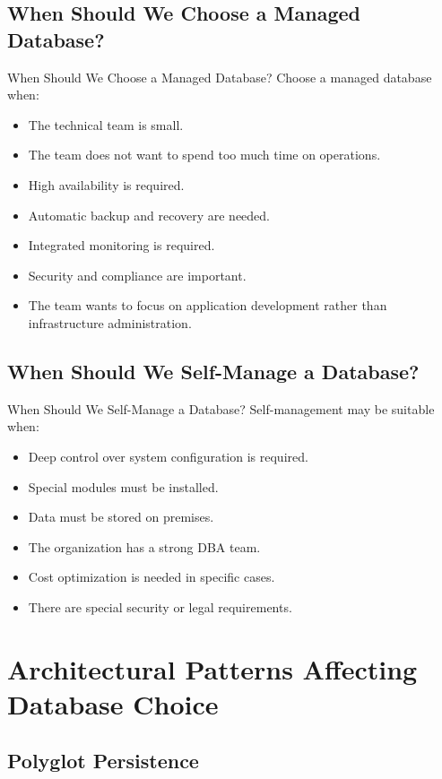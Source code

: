 \documentclass[aspectratio=169,11pt]{beamer}
\newcommand{\smallitem}{\setlength{\itemsep}{2pt}\setlength{\parskip}{0pt}}
\begin{document}
\subsection{When Should We Choose a Managed Database?}
\begin{frame}{When Should We Choose a Managed Database?}
Choose a managed database when:
\begin{itemize}
  \smallitem
  \item The technical team is small.
  \item The team does not want to spend too much time on operations.
  \item High availability is required.
  \item Automatic backup and recovery are needed.
  \item Integrated monitoring is required.
  \item Security and compliance are important.
  \item The team wants to focus on application development rather than infrastructure administration.
\end{itemize}
\end{frame}

\subsection{When Should We Self-Manage a Database?}
\begin{frame}{When Should We Self-Manage a Database?}
Self-management may be suitable when:
\begin{itemize}
  \smallitem
  \item Deep control over system configuration is required.
  \item Special modules must be installed.
  \item Data must be stored on premises.
  \item The organization has a strong DBA team.
  \item Cost optimization is needed in specific cases.
  \item There are special security or legal requirements.
\end{itemize}
\end{frame}

\section{Architectural Patterns Affecting Database Choice}
\subsection{Polyglot Persistence}
\end{document}
